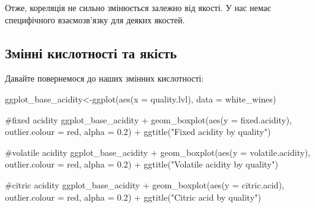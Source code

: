 \documentclass[
  letterpaper,
  DIV=11,
  numbers=noendperiod]{scrreprt}
\newenvironment{Shaded}{\begin{snugshade}}{\end{snugshade}}
\newcommand{\AttributeTok}[1]{\textcolor[rgb]{0.40,0.45,0.13}{#1}}
\newcommand{\CommentTok}[1]{\textcolor[rgb]{0.37,0.37,0.37}{#1}}
\newcommand{\FloatTok}[1]{\textcolor[rgb]{0.68,0.00,0.00}{#1}}
\newcommand{\FunctionTok}[1]{\textcolor[rgb]{0.28,0.35,0.67}{#1}}
\newcommand{\NormalTok}[1]{\textcolor[rgb]{0.00,0.23,0.31}{#1}}
\newcommand{\OtherTok}[1]{\textcolor[rgb]{0.00,0.23,0.31}{#1}}
\newcommand{\SpecialCharTok}[1]{\textcolor[rgb]{0.37,0.37,0.37}{#1}}
\newcommand{\StringTok}[1]{\textcolor[rgb]{0.13,0.47,0.30}{#1}}
\begin{document}
Отже, кореляція не сильно змінюється залежно від якості. У нас немає
специфічного взаємозв'язку для деяких якостей.

\subsection{Змінні кислотності та
якість}\label{ux437ux43cux456ux43dux43dux456-ux43aux438ux441ux43bux43eux442ux43dux43eux441ux442ux456-ux442ux430-ux44fux43aux456ux441ux442ux44c}

Давайте повернемося до наших змінних кислотності:

\begin{Shaded}
\begin{Highlighting}[]
\NormalTok{ggplot\_base\_acidity}\OtherTok{\textless{}{-}}\FunctionTok{ggplot}\NormalTok{(}\FunctionTok{aes}\NormalTok{(}\AttributeTok{x =}\NormalTok{ quality.lvl), }\AttributeTok{data =}\NormalTok{ white\_wines)}

\CommentTok{\#fixed acidity}
\NormalTok{ggplot\_base\_acidity }\SpecialCharTok{+}
  \FunctionTok{geom\_boxplot}\NormalTok{(}\FunctionTok{aes}\NormalTok{(}\AttributeTok{y =}\NormalTok{ fixed.acidity), }\AttributeTok{outlier.colour =} \StringTok{\textquotesingle{}red\textquotesingle{}}\NormalTok{, }\AttributeTok{alpha =} \FloatTok{0.2}\NormalTok{) }\SpecialCharTok{+}
  \FunctionTok{ggtitle}\NormalTok{(}\StringTok{"Fixed acidity by quality"}\NormalTok{)}

\CommentTok{\#volatile acidity}
\NormalTok{ggplot\_base\_acidity }\SpecialCharTok{+}
  \FunctionTok{geom\_boxplot}\NormalTok{(}\FunctionTok{aes}\NormalTok{(}\AttributeTok{y =}\NormalTok{ volatile.acidity), }\AttributeTok{outlier.colour =} \StringTok{\textquotesingle{}red\textquotesingle{}}\NormalTok{, }\AttributeTok{alpha =} \FloatTok{0.2}\NormalTok{) }\SpecialCharTok{+}
  \FunctionTok{ggtitle}\NormalTok{(}\StringTok{"Volatile acidity by quality"}\NormalTok{)}

\CommentTok{\#citric acidity}
\NormalTok{ggplot\_base\_acidity }\SpecialCharTok{+}
  \FunctionTok{geom\_boxplot}\NormalTok{(}\FunctionTok{aes}\NormalTok{(}\AttributeTok{y =}\NormalTok{ citric.acid), }\AttributeTok{outlier.colour =} \StringTok{\textquotesingle{}red\textquotesingle{}}\NormalTok{, }\AttributeTok{alpha =} \FloatTok{0.2}\NormalTok{) }\SpecialCharTok{+}
  \FunctionTok{ggtitle}\NormalTok{(}\StringTok{"Citric acid by quality"}\NormalTok{)}
\end{Highlighting}
\end{Shaded}
\end{document}
